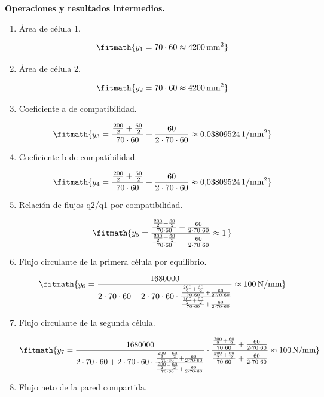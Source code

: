 \noindent\textbf{Operaciones y resultados intermedios.}

\begin{enumerate}

\item Área de célula 1.

\[\fitmath{y_{1}=70\cdot 60\approx 4200\,\mathrm{mm^{2}}}\]

\item Área de célula 2.

\[\fitmath{y_{2}=70\cdot 60\approx 4200\,\mathrm{mm^{2}}}\]

\item Coeficiente a de compatibilidad.

\[\fitmath{y_{3}=\frac{\frac{200}{2}+\frac{60}{2}}{70\cdot 60}+\frac{60}{2\cdot 70\cdot 60}\approx 0{,}03809524\,\mathrm{1/mm^{2}}}\]

\item Coeficiente b de compatibilidad.

\[\fitmath{y_{4}=\frac{\frac{200}{2}+\frac{60}{2}}{70\cdot 60}+\frac{60}{2\cdot 70\cdot 60}\approx 0{,}03809524\,\mathrm{1/mm^{2}}}\]

\item Relación de flujos q2/q1 por compatibilidad.

\[\fitmath{y_{5}=\frac{\frac{\frac{200}{2}+\frac{60}{2}}{70\cdot 60}+\frac{60}{2\cdot 70\cdot 60}}{\frac{\frac{200}{2}+\frac{60}{2}}{70\cdot 60}+\frac{60}{2\cdot 70\cdot 60}}\approx 1\,}\]

\item Flujo circulante de la primera célula por equilibrio.

\[\fitmath{y_{6}=\frac{1680000}{2\cdot 70\cdot 60+2\cdot 70\cdot 60\cdot \frac{\frac{\frac{200}{2}+\frac{60}{2}}{70\cdot 60}+\frac{60}{2\cdot 70\cdot 60}}{\frac{\frac{200}{2}+\frac{60}{2}}{70\cdot 60}+\frac{60}{2\cdot 70\cdot 60}}}\approx 100\,\mathrm{N/mm}}\]

\item Flujo circulante de la segunda célula.

\[\fitmath{y_{7}=\frac{1680000}{2\cdot 70\cdot 60+2\cdot 70\cdot 60\cdot \frac{\frac{\frac{200}{2}+\frac{60}{2}}{70\cdot 60}+\frac{60}{2\cdot 70\cdot 60}}{\frac{\frac{200}{2}+\frac{60}{2}}{70\cdot 60}+\frac{60}{2\cdot 70\cdot 60}}}\cdot \frac{\frac{\frac{200}{2}+\frac{60}{2}}{70\cdot 60}+\frac{60}{2\cdot 70\cdot 60}}{\frac{\frac{200}{2}+\frac{60}{2}}{70\cdot 60}+\frac{60}{2\cdot 70\cdot 60}}\approx 100\,\mathrm{N/mm}}\]

\item Flujo neto de la pared compartida.


\end{enumerate}

